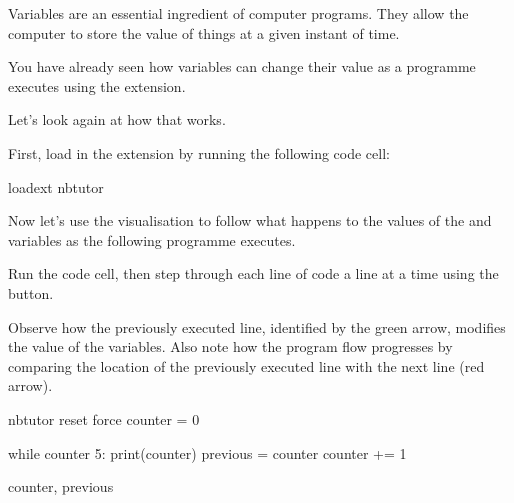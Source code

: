 \documentclass[letterpaper,10pt,english]{sphinxmanual}
\begin{document}
Variables are an essential ingredient of computer programs. They allow the computer to store the value of things at a given instant of time.

You have already seen how variables can change their value as a programme executes using the  extension.

Let’s look again at how that works.

First, load in the  extension by running the following code cell:

{
\begin{sphinxVerbatim}[commandchars=\\\{\}]
\llap{\color{nbsphinxin}[ ]:\,\hspace{\fboxrule}\hspace{\fboxsep}}\PYGZpc{}load\PYGZus{}ext nbtutor
\end{sphinxVerbatim}
}

Now let’s use the  visualisation to follow what happens to the values of the  and  variables as the following programme executes.

Run the code cell, then step through each line of code a line at a time using the   button.

Observe how the previously executed line, identified by the green arrow, modifies the value of the variables. Also note how the program flow progresses by comparing the location of the previously executed line with the next line (red arrow).

{
\begin{sphinxVerbatim}[commandchars=\\\{\}]
\llap{\color{nbsphinxin}[ ]:\,\hspace{\fboxrule}\hspace{\fboxsep}}\PYGZpc{}\PYGZpc{}nbtutor \PYGZhy{}\PYGZhy{}reset \PYGZhy{}\PYGZhy{}force
counter = 0

while counter \PYGZlt{} 5:
    print(counter)
    previous = counter
    counter += 1

counter, previous
\end{sphinxVerbatim}
}
\end{document}
